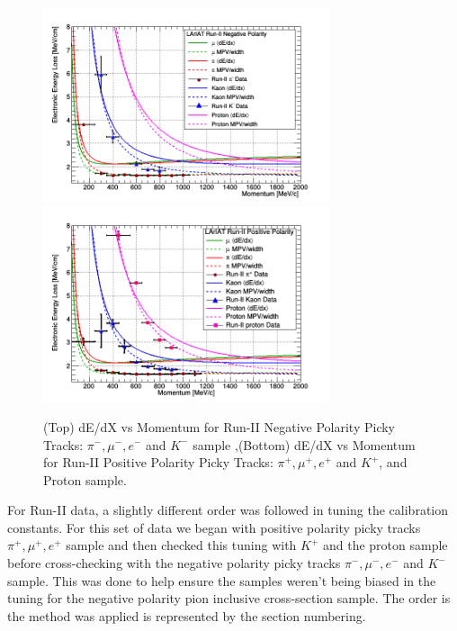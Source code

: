 \begin{figure}[h!]
\centering
\includegraphics[width=0.75\textwidth]{images/RunIINegTotaldEdXvsMomentum.png}
\includegraphics[width=0.75\textwidth]{images/RunIIPosTotaldEdXvsMomentum.png}
\caption{(Top) dE/dX vs Momentum for Run-II Negative Polarity Picky Tracks: $\pi^{-}, \mu^{-}, e^{-}$ and $K^{-}$ sample ,(Bottom) dE/dX vs Momentum for Run-II Positive Polarity Picky Tracks: $\pi^{+}, \mu^{+}, e^{+}$ and $K^{+}$, and Proton sample. }
\label{fig:Run2NegPosPickyTrkTotal}
\end{figure}

For Run-II data, a slightly different order was followed in tuning the calibration constants. For this set of data we began with positive polarity picky tracks  $\pi^{+}, \mu^{+}, e^{+}$ sample and then checked this tuning with $K^{+}$ and the proton sample before cross-checking with the negative polarity picky tracks  $\pi^{-}, \mu^{-}, e^{-}$ and $K^{-}$ sample. This was done to help ensure the samples weren't being biased in the tuning for the negative polarity pion inclusive cross-section sample.  The order is the method was applied is represented by the section numbering.

